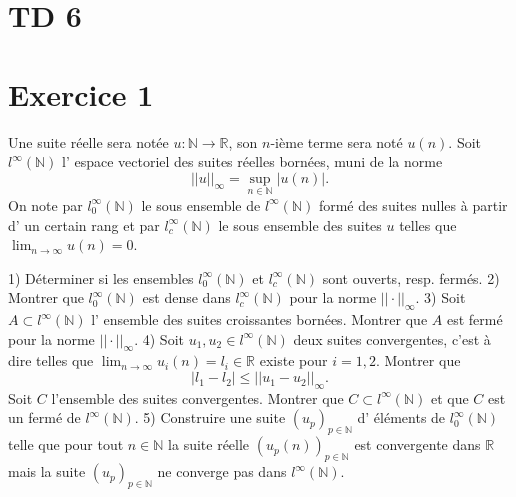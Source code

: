 \documentclass{article}
\begin{document}
\sloppy

\section*{TD 6}

\section*{Exercice 1}
Une suite réelle sera notée $u : \mathbb{N} \to \mathbb{R}$, son $n$-ième terme sera noté $u(n)$. Soit $l^{\infty}(\mathbb{N})$ l' espace vectoriel des suites réelles bornées, muni de la norme
\[ ||u||_{\infty} = \sup_{n \in \mathbb{N}} |u(n)|. \]
On note par $l_0^{\infty}(\mathbb{N})$ le sous ensemble de $l^{\infty}(\mathbb{N})$ formé des suites nulles à partir d' un certain rang et par $l_c^{\infty}(\mathbb{N})$ le sous ensemble des suites $u$ telles que $\lim_{n \to \infty} u(n) = 0$.

1) Déterminer si les ensembles $l_0^{\infty}(\mathbb{N})$ et $l_c^{\infty}(\mathbb{N})$ sont ouverts, resp. fermés.
2) Montrer que $l_0^{\infty}(\mathbb{N})$ est dense dans $l_c^{\infty}(\mathbb{N})$ pour la norme $|| \cdot ||_{\infty}$.
3) Soit $A \subset l^{\infty}(\mathbb{N})$ l' ensemble des suites croissantes bornées. Montrer que $A$ est fermé pour la norme $|| \cdot ||_{\infty}$.
4) Soit $u_1, u_2 \in l^{\infty}(\mathbb{N})$ deux suites convergentes, c'est à dire telles que $\lim_{n \to \infty} u_i(n) = l_i \in \mathbb{R}$ existe pour $i=1,2$. Montrer que
\[ |l_1 - l_2| \le ||u_1 - u_2||_{\infty}. \]
Soit $C$ l'ensemble des suites convergentes. Montrer que $C \subset l^{\infty}(\mathbb{N})$ et que $C$ est un fermé de $l^{\infty}(\mathbb{N})$.
5) Construire une suite $(u_p)_{p \in \mathbb{N}}$ d' éléments de $l_0^{\infty}(\mathbb{N})$ telle que pour tout $n \in \mathbb{N}$ la suite réelle $(u_p(n))_{p \in \mathbb{N}}$ est convergente dans $\mathbb{R}$ mais la suite $(u_p)_{p \in \mathbb{N}}$ ne converge pas dans $l^{\infty}(\mathbb{N})$.
\end{document}
